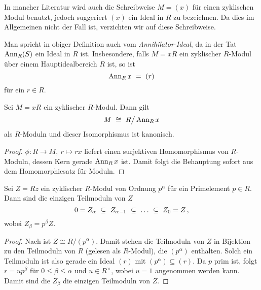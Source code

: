 \begin{bemerkung}
  In mancher Literatur wird auch die Schreibweise $M = (x)$ für einen
  zyklischen Modul benutzt, jedoch suggeriert $(x)$ ein Ideal in $R$ zu
  bezeichnen. Da dies im Allgemeinen nicht der Fall ist, verzichten wir auf
  diese Schreibweise.
\end{bemerkung}

\begin{bemerkung}
  Man spricht in obiger Definition auch vom \emph{Annihilator-Ideal}, da in der
  Tat $\operatorname{Ann}_R(S)$ ein Ideal in $R$ ist. Insbesondere, falls 
  $M = xR$ ein zyklischer $R$-Modul über einem Hauptidealbereich $R$ ist, so
  ist 
  \[ \operatorname{Ann}_R x \ =\  (r)\]
  für ein $r\in R$.
\end{bemerkung}


\begin{lemma}
  \label{lemma:zyklischer_modul_iso}
  Sei $M = xR$ ein zyklischer $R$-Modul. Dann gilt
  \[M \ \cong\  R\big/\operatorname{Ann}_Rx\]
  als $R$-Moduln und dieser Isomorphismus ist kanonisch.
\end{lemma}
\begin{proof}
  $\phi:R \to M,\ r \mapsto rx$ liefert einen surjektiven Homomorphismus von
  $R$-Moduln, dessen Kern gerade $\operatorname{Ann}_Rx$ ist. Damit folgt die Behauptung
  sofort aus dem Homomorphiesatz für Moduln.
\end{proof}

\begin{lemma}
  \label{lemma:teilmoduln_prim_moduln}
  Sei $Z = Rz$ ein zyklischer $R$-Modul von Ordnung $p^\alpha$ für ein
  Primelement $p\in R$. Dann sind die einzigen Teilmoduln von $Z$
  \[ 0 = Z_\alpha \ \subseteq\  Z_{\alpha-1} \ \subseteq\  \ldots
    \ \subseteq\  Z_0 = Z \,,\]
  wobei $Z_\beta = p^\beta Z$.
\end{lemma}
\begin{proof}
  Nach  ist $Z \cong R\big/(p^\alpha)$. Damit
  stehen die Teilmoduln von $Z$ in Bijektion zu den Teilmoduln von
  $R$ (gelesen als $R$-Modul), die $(p^\alpha)$ enthalten. Solch ein
  Teilmoduln ist also gerade ein Ideal $(r)$ mit 
  $(p^\alpha)\subseteq (r)$. Da $p$ prim ist, folgt $r = up^\beta$ für
  $0\leq\beta \leq \alpha$ und $u\in R^\times$, wobei $u=1$ \obda angenommen
  werden kann. Damit sind die $Z_\beta$ die einzigen Teilmoduln von $Z$.
\end{proof}



